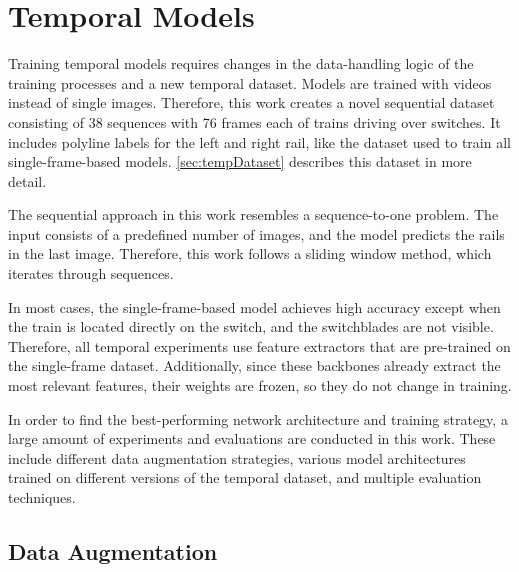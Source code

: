 \section{Temporal Models}
\label{sec:temporalModelsExperiments}

Training temporal models requires changes in the data-handling logic of the training processes and a new temporal dataset.
Models are trained with videos instead of single images.
Therefore, this work creates a novel sequential dataset consisting of 38 sequences with 76 frames each of trains driving over switches.
It includes polyline labels for the left and right rail, like the dataset used to train all single-frame-based models.
\autoref{sec:tempDataset} describes this dataset in more detail.

The sequential approach in this work resembles a sequence-to-one problem.
The input consists of a predefined number of images, and the model predicts the rails in the last image.
Therefore, this work follows a sliding window method, which iterates through sequences.

In most cases, the single-frame-based model achieves high accuracy except when the train is located directly on the switch, and the switchblades are not visible.
Therefore, all temporal experiments use feature extractors that are pre-trained on the single-frame dataset.
Additionally, since these backbones already extract the most relevant features, their weights are frozen, so they do not change in training.

In order to find the best-performing network architecture and training strategy, a large amount of experiments and evaluations are conducted in this work.
These include different data augmentation strategies, various model architectures trained on different versions of the temporal dataset, and multiple evaluation techniques.

\subsection{Data Augmentation}

